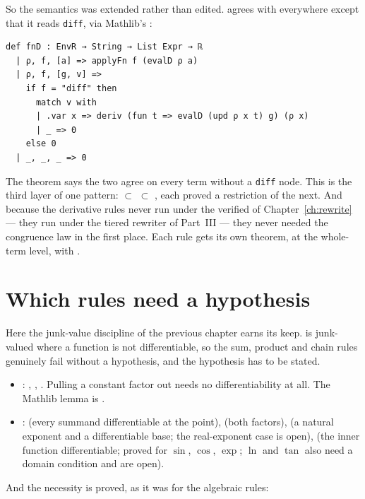 So the semantics was extended rather than edited.  agrees with  everywhere
except that it reads \texttt{diff}, via Mathlib's :

\begin{verbatim}
def fnD : EnvR → String → List Expr → ℝ
  | ρ, f, [a] => applyFn f (evalD ρ a)
  | ρ, f, [g, v] =>
    if f = "diff" then
      match v with
      | .var x => deriv (fun t => evalD (upd ρ x t) g) (ρ x)
      | _ => 0
    else 0
  | _, _, _ => 0
\end{verbatim}

The theorem  says the two agree on every term without a \texttt{diff} node.
This is the third layer of one pattern:  $\subset$  $\subset$ ,
each proved a restriction of the next. And because the derivative rules never run under the
verified  of Chapter~\ref{ch:rewrite} --- they run under the tiered rewriter of
Part~III --- they never needed the congruence law in the first place. Each rule gets its own
theorem, at the whole-term level, with .

\section{Which rules need a hypothesis}

Here the junk-value discipline of the previous chapter earns its keep.  is junk-valued
where a function is not differentiable, so the sum, product and chain rules genuinely fail
without a hypothesis, and the hypothesis has to be stated.

\begin{itemize}[nosep]
  \item {}: , , .
    Pulling a constant factor out needs no differentiability at all.
    The Mathlib lemma is .
  \item {}:  (every summand differentiable at the point),
     (both factors),  (a natural exponent and a differentiable
    base; the real-exponent case is open),  (the inner function differentiable;
    proved for $\sin$, $\cos$, $\exp$; $\ln$ and $\tan$ also need a domain condition and are open).
\end{itemize}

And the necessity is proved, as it was for the algebraic rules:


